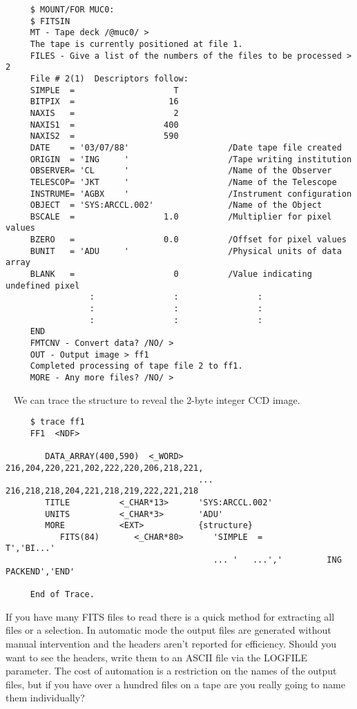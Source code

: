 {\small
\begin{verbatim}
     $ MOUNT/FOR MUC0:
     $ FITSIN
     MT - Tape deck /@muc0/ >
     The tape is currently positioned at file 1.
     FILES - Give a list of the numbers of the files to be processed > 2
     File # 2(1)  Descriptors follow:
     SIMPLE  =                    T
     BITPIX  =                   16
     NAXIS   =                    2
     NAXIS1  =                  400
     NAXIS2  =                  590
     DATE    = '03/07/88'                    /Date tape file created
     ORIGIN  = 'ING     '                    /Tape writing institution
     OBSERVER= 'CL      '                    /Name of the Observer
     TELESCOP= 'JKT     '                    /Name of the Telescope
     INSTRUME= 'AGBX    '                    /Instrument configuration
     OBJECT  = 'SYS:ARCCL.002'               /Name of the Object
     BSCALE  =                  1.0          /Multiplier for pixel values
     BZERO   =                  0.0          /Offset for pixel values
     BUNIT   = 'ADU     '                    /Physical units of data array
     BLANK   =                    0          /Value indicating undefined pixel
                 :                :                :
                 :                :                :
                 :                :                :
     END
     FMTCNV - Convert data? /NO/ >
     OUT - Output image > ff1
     Completed processing of tape file 2 to ff1.
     MORE - Any more files? /NO/ >
\end{verbatim}\
\normalsize
We can trace the structure to reveal the 2-byte integer CCD image.

\small
\begin{verbatim}
     $ trace ff1
     FF1  <NDF>
 
        DATA_ARRAY(400,590)  <_WORD>   216,204,220,221,202,222,220,206,218,221,
                                       ... 216,218,218,204,221,218,219,222,221,218
        TITLE          <_CHAR*13>      'SYS:ARCCL.002'
        UNITS          <_CHAR*3>       'ADU'
        MORE           <EXT>           {structure}
           FITS(84)       <_CHAR*80>      'SIMPLE  =                    T','BI...'
                                          ... '   ...','         ING PACKEND','END'
   
     End of Trace.
\end{verbatim}
\normalsize
If you have many FITS files to read there is a quick method for
extracting all files or a selection.  In automatic mode the output files
are generated without manual intervention and the headers aren't reported
for efficiency.  Should you want to see the headers, write them to an ASCII
file via the LOGFILE parameter. The cost of automation is a restriction
on the names of the output files, but if you have over a hundred files
on a tape are you really going to name them individually?

}
